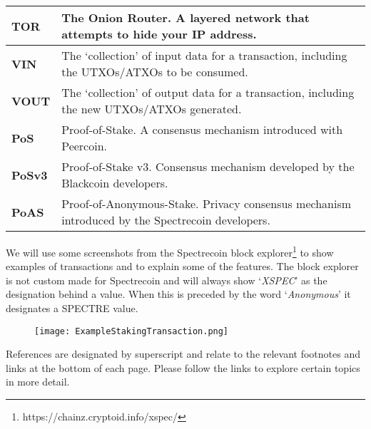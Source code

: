 \begin{table}[h]
{\begin{tabular}{@{}ll@{}}
\textbf{TOR} & The Onion Router. A layered network that attempts to hide 
your IP address. \\ 
\midrule
\textbf{VIN} & The ‘collection’ of input data for a transaction, including 
the UTXOs/ATXOs to be consumed. \\ 
\midrule
\textbf{VOUT} & The ‘collection’ of output data for a transaction, including 
the new UTXOs/ATXOs generated. \\ 
\midrule
\textbf{PoS} & Proof-of-Stake. A consensus mechanism introduced with Peercoin. \\ 
\midrule
\textbf{PoSv3} & Proof-of-Stake v3. Consensus mechanism developed by the 
Blackcoin developers. \\ 
\midrule
\textbf{PoAS} & Proof-of-Anonymous-Stake. Privacy consensus mechanism 
introduced by the Spectrecoin developers. \\ 
\hline
\end{tabular}%
}
\end{table}
\noindent
We will use some screenshots from the Spectrecoin block
explorer\footnote{https://chainz.cryptoid.info/xspec/} to show examples of
transactions and to explain some of the features. The block explorer
is not custom made for Spectrecoin and will always show ‘\textit{XSPEC}’
as the designation behind a value. When this is preceded by the word
‘\textit{Anonymous}’ it designates a SPECTRE value.
\begin{figure}[ht]
	\centering
	\texttt{[image: ExampleStakingTransaction.png]}
\end{figure}
\noindent
References are designated by superscript and relate to the relevant
footnotes and links at the bottom of each page. Please follow the links to
explore certain topics in more detail.